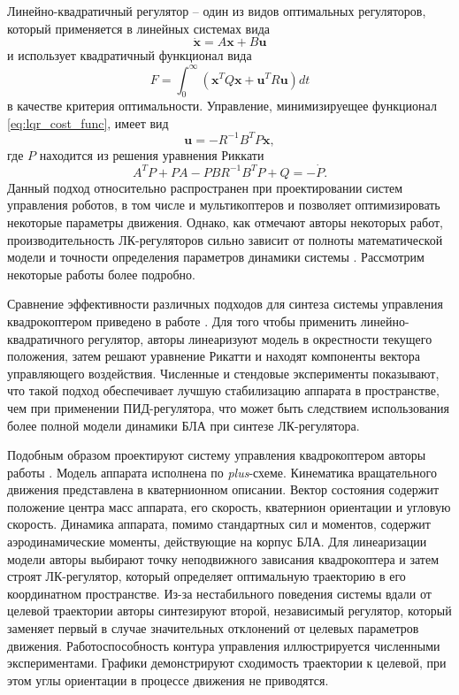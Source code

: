 Линейно-квадратичный регулятор -- один из видов оптимальных регуляторов, который применяется в линейных системах вида
\begin{equation} \label{eq:linear_dyn_system}
\dot{\bm{x}} = A\bm{x} + B\bm{u}
\end{equation}
и  использует квадратичный функционал вида
	\begin{equation} \label{eq:lqr_cost_func}
	F = \int_0^{\infty}{(\bm{x}^T Q \bm{x} + \bm{u}^T R \bm{u})} dt
	\end{equation}
в качестве критерия оптимальности. Управление, минимизируещее функционал \eqref{eq:lqr_cost_func}, имеет вид \cite{Letov01}
	\begin{equation} \label{eq:lqr_control_law}
	\bm{u} = -R^{-1} B^T P \bm{x},
	\end{equation}
где $P$ находится из решения уравнения Риккати
	\begin{equation} \label{eq:riqatty}
	A^T P + P A - P B R^{-1} B^T P + Q = -\dot{P}.
	\end{equation}
Данный подход относительно распространен при проектировании систем управления роботов, в том числе и мультикоптеров \cite{Baklanov01, Muhhamid01, Argentim01} и позволяет оптимизировать некоторые параметры движения. Однако, как отмечают авторы некоторых работ, производительность ЛК-регуляторов сильно зависит от полноты математической модели и точности определения параметров динамики системы \cite{Kim01, Joukhadar01}. Рассмотрим некоторые работы более подробно.

Сравнение эффективности различных подходов для синтеза системы управления квадрокоптером приведено в работе \cite{Bouabdallah01}. Для того чтобы применить линейно-квадратичного регулятор, авторы линеаризуют модель в окрестности текущего положения, затем решают уравнение Рикатти и находят компоненты вектора управляющего воздействия.
Численные и стендовые эксперименты показывают, что такой подход обеспечивает лучшую стабилизацию аппарата в пространстве, чем при применении ПИД-регулятора, что может быть следствием использования более полной модели динамики БЛА при синтезе ЛК-регулятора.

Подобным образом проектируют систему управления квадрокоптером авторы работы \cite{Reyes-Valeria01}. Модель аппарата исполнена по \textit{plus}-схеме. Кинематика вращательного движения представлена в кватернионном описании. Вектор состояния содержит положение центра масс аппарата, его скорость, кватернион ориентации и угловую скорость. Динамика аппарата, помимо стандартных сил и моментов, содержит аэродинамические моменты, действующие на корпус БЛА. Для линеаризации модели авторы выбирают точку неподвижного зависания квадрокоптера и затем строят ЛК-регулятор, который определяет оптимальную траекторию в его координатном пространстве. Из-за нестабильного поведения системы вдали от целевой траектории авторы синтезируют второй, независимый регулятор, который заменяет первый в случае значительных отклонений от целевых параметров движения. Работоспособность контура управления иллюстрируется численными экспериментами. Графики демонстрируют сходимость траектории к целевой, при этом углы ориентации в процессе движения не приводятся.

